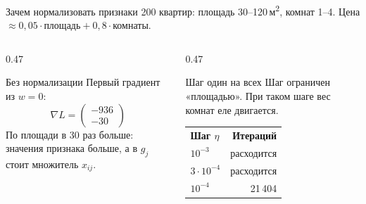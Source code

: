 \begin{frame}[c]{Зачем нормализовать признаки}
  \small
  200 квартир: площадь 30--120\,м\textsuperscript{2}, комнат 1--4. Цена $\approx 0{,}05\cdot\text{площадь} + 0{,}8\cdot\text{комнаты}$.

  \medskip
  \begin{columns}[T]
    \begin{column}{0.47\textwidth}
      \begin{block}{Без нормализации}
        \small
        Первый градиент из $w = 0$:
        \[\nabla L = \begin{pmatrix} -936\\ -30\end{pmatrix}\]
        По площади в 30 раз больше: значения признака больше, а в $g_j$ стоит множитель $x_{ij}$.
      \end{block}
    \end{column}
    \begin{column}{0.47\textwidth}
      \begin{block}{Шаг один на всех}
        \small
        Шаг ограничен «площадью». При таком шаге вес комнат еле двигается.
        \smallskip
        \small
        \begin{tabular}{lr}
          \textbf{Шаг $\eta$} & \textbf{Итераций}\\
          $10^{-3}$ & расходится\\
          $3\cdot10^{-4}$ & расходится\\
          $10^{-4}$ & 21\,404\\
        \end{tabular}
      \end{block}
    \end{column}
  \end{columns}
\end{frame}

